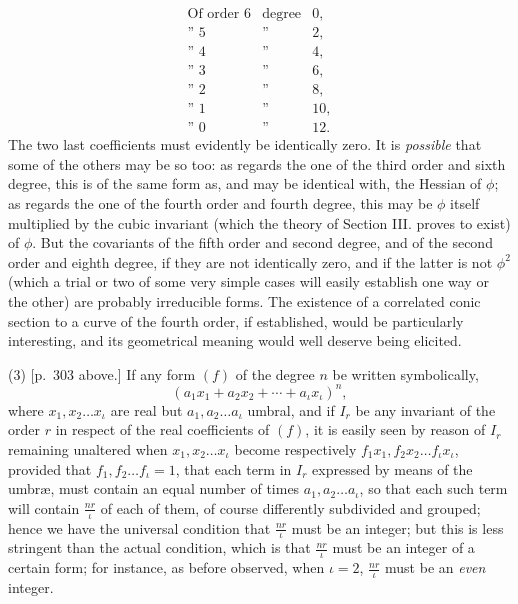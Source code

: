 \documentclass[11pt]{article}
\newcommand{\sourcepage}[1]{\marginpar{\scriptsize p.~#1}}
\begin{document}
\sourcepage{323}
\[
\begin{array}{ccc}
\text{Of order }6&\text{degree}&0,\\
\text{'' }5&\text{''}&2,\\
\text{'' }4&\text{''}&4,\\
\text{'' }3&\text{''}&6,\\
\text{'' }2&\text{''}&8,\\
\text{'' }1&\text{''}&10,\\
\text{'' }0&\text{''}&12.
\end{array}
\]
The two last coefficients must evidently be identically zero. It is \emph{possible} that some of the others may be so too: as regards the one of the third order and sixth degree, this is of the same form as, and may be identical with, the Hessian of $\phi$; as regards the one of the fourth order and fourth degree, this may be $\phi$ itself multiplied by the cubic invariant (which the theory of Section III. proves to exist) of $\phi$. But the covariants of the fifth order and second degree, and of the second order and eighth degree, if they are not identically zero, and if the latter is not $\phi^2$ (which a trial or two of some very simple cases will easily establish one way or the other) are probably irreducible forms. The existence of a correlated conic section to a curve of the fourth order, if established, would be particularly interesting, and its geometrical meaning would well deserve being elicited.

(3) [p.~303 above.] If any form $(f)$ of the degree $n$ be written symbolically,
\[
(a_1x_1+a_2x_2+\cdots+a_\iota x_\iota)^n,
\]
where $x_1,x_2\ldots x_\iota$ are real but $a_1,a_2\ldots a_\iota$ umbral, and if $I_r$ be any invariant of the order $r$ in respect of the real coefficients of $(f)$, it is easily seen by reason of $I_r$ remaining unaltered when $x_1,x_2\ldots x_\iota$ become respectively $f_1x_1,f_2x_2\ldots f_\iota x_\iota$, provided that $f_1,f_2\ldots f_\iota=1$, that each term in $I_r$ expressed by means of the umbræ, must contain an equal number of times $a_1,a_2\ldots a_\iota$, so that each such term will contain $\frac{nr}{\iota}$ of each of them, of course differently subdivided and grouped; hence we have the universal condition that $\frac{nr}{\iota}$ must be an integer; but this is less stringent than the actual condition, which is that $\frac{nr}{\iota}$ must be an integer of a certain form; for instance, as before observed, when $\iota=2$, $\frac{nr}{\iota}$ must be an \emph{even} integer.
\end{document}
